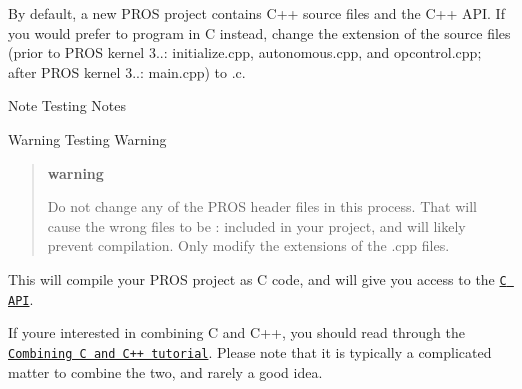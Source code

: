 By default, a new P\+R\+OS project contains C++ source files and the C++ A\+PI. If you would prefer to program in C instead, change the extension of the source files (prior to P\+R\+OS kernel 3..\+: {\ttfamily initialize.\+cpp}, {\ttfamily autonomous.\+cpp}, and {\ttfamily opcontrol.\+cpp}; after P\+R\+OS kernel 3..\+: {\ttfamily main.\+cpp}) to {\ttfamily .c}.

\begin{DoxyNote}{Note}
Testing Notes
\end{DoxyNote}
\begin{DoxyWarning}{Warning}
Testing Warning
\end{DoxyWarning}
\begin{quote}
{\bfseries warning}

Do not change any of the P\+R\+OS header files in this process. That will cause the wrong files to be \+: included in your project, and will likely prevent compilation. Only modify the extensions of the {\ttfamily .cpp} files.

\end{quote}
This will compile your P\+R\+OS project as C code, and will give you access to the \href{../../api/c/index.html}{\tt C A\+PI}.

If you\textquotesingle{}re interested in combining C and C++, you should read through the \href{../general/combining-c-cpp.html}{\tt Combining C and C++ tutorial}. Please note that it is typically a complicated matter to combine the two, and rarely a good idea. 